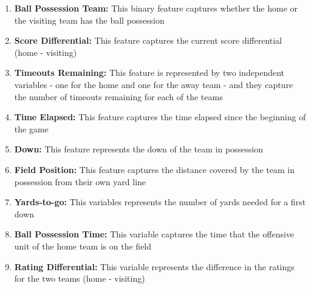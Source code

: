 \documentclass{sig-alternate}
\begin{document}
\begin{enumerate}
\item {\bf Ball Possession Team:} This binary feature captures whether the home or the visiting team has the ball possession
\item {\bf Score Differential:} This feature captures the current score differential (home - visiting)
\item {\bf Timeouts Remaining:} This feature is represented by two independent variables - one for the home and one for the away team - and they capture the number of timeouts remaining for each of the teams
\item {\bf Time Elapsed: } This feature captures the time elapsed since the beginning of the game
\item {\bf Down:} This feature represents the down of the team in possession
\item {\bf Field Position:} This feature captures the distance covered by the team in possession from their own yard line
\item {\bf Yards-to-go:} This variables represents the number of yards needed for a first down
\item {\bf Ball Possession Time: } This variable captures the time that the offensive unit of the home team is on the field 
\item {\bf Rating Differential: } This variable represents the difference in the ratings for the two teams (home - visiting)
\end{enumerate}
\end{document}
